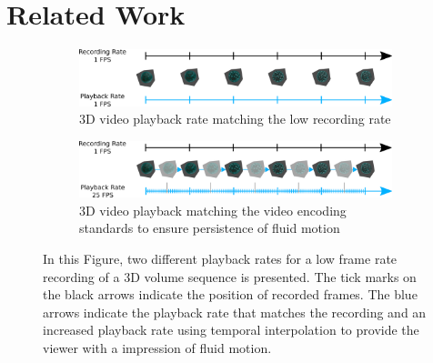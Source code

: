 \section{Related Work}





















\begin{figure}[H]
    \centering
    \begin{subfigure}[b]{0.96\textwidth}
        \includegraphics[width=\textwidth]{images/01_introduction/motivation_temporal_superresolution_one.pdf}
        \caption{3D video playback rate matching the low recording rate}
        \label{subfig:playback_rate_matching}
    \end{subfigure}
    
	\vspace{1.0cm}
    
    \begin{subfigure}[b]{0.96\textwidth}
        \includegraphics[width=\textwidth]{images/01_introduction/motivation_temporal_superresolution_two.pdf}
        \caption{3D video playback matching the video encoding standards to ensure persistence of fluid motion}
        \label{subfig:playback_rate_higher}
    \end{subfigure}
    \caption[Concept of Temporal Super Resolution in a 3D Video Player]{In this Figure, two different playback rates for a low frame rate recording of a 3D volume sequence is presented. The tick marks on the black arrows indicate the position of recorded frames. The blue arrows indicate the playback rate that matches the recording  and an increased playback rate  using temporal interpolation to provide the viewer with a impression of fluid motion. }
    \label{fig:temporal_superresolution}
\end{figure}

